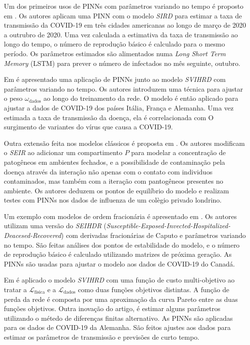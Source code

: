 Um dos primeiros usos de PINNs com parâmetros variando no tempo é proposto em 
\cite{long-etal:21-L2}. Os autores aplicam uma PINN com o modelo \textit{SIRD}
para estimar a taxa de transmissão da COVID-19 em três cidades americanas
ao longo de março de 2020 a outrubro de 2020. Uma vez calculada a estimativa da 
taxa de transmissão ao longo do tempo, o número de reprodução básico é calculado
para o mesmo período. 
Os parâmetros estimados são alimentados numa \textit{Long Short Term Memory} 
(LSTM) para prever o número de infectados no mês seguinte, outubro. 

Em \cite{shamsara-etal:25-omicron} é apresentado uma aplicação de PINNs
junto ao modelo \textit{SVIHRD} com parâmetros variando no tempo. 
Os autores introduzem uma técnica para ajustar o peso $\omega_{\text{dados}}$ 
ao longo do treinamento da rede. O modelo é então aplicado
para ajustar a dados de COVID-19 dos países Itália, França e Alemanha. 
Uma vez estimada a taxa de transmissão da doença, ela é correlacionada com O
surgimento de variantes do vírus que causa a COVID-19.

Outra extensão feita nos modelos clássicos é proposta em \cite{nguyen-etal:22-raissi-seirp}.
Os autores modificam o \textit{SEIR} ao adicionar um compartimento $P$ para 
modelar a concentração de patogêneos em ambientes fechados, e a possibilidade
de contaminação pela doença através da interação não apenas com o contato com
individuos contaminados, mas também com a iteração com pantogêneos presentes no
ambiente. Os autores deduzem os pontos de equilíbrio do modelo e 
realizam testes com PINNs nos dados de influenza de um colègio
privado londrino.     

Um exemplo com modelos de ordem fracionária é apresentado em 
\cite{li-etal:25-ordem-fracionaria}. Os autores utilizam uma versão do 
\textit{SEIHDR} (\textit{Susceptible-Exposed-Invected-Hospitalized-Deacesed-Recovered}) 
com derivadas fracionárias de Caputo e parâmetros variando no tempo.
São feitas análises dos pontos de estabilidade do modelo, e o número de reprodução
básico é calculado utilizando matrizes de próxima geração. 
As PINNs são usadas para ajustar o modelo aos dados de COVID-19 do Canadá.

Em \cite{heldmann-etal:23-biobjective-opt} é aplicado o modelo \textit{SVIHRD}
com uma função de custo multi-objetivo ao tratar a $\mathcal{L}_{\text{física}}$
e a $\mathcal{L}_{\text{dados}}$ como duas funções objetivos distintas.
A função de perda da rede é composta por uma aproximação da curva Pareto entre 
as duas funções objetivos.
Outra inovação do artigo, é estimar alguns parâmetros utilizando o métedo de 
diferenças finitas alternativo. 
As PINNs são aplicadas para os dados de COVID-19 da Alemanha. São feitos ajustes
aos dados para estimar os parâmetros de transmissão e previsões de curto tempo.  

